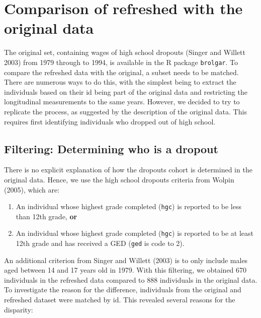 \documentclass[12pt]{article}
\providecommand{\tightlist}{%
  \setlength{\itemsep}{0pt}\setlength{\parskip}{0pt}}
\begin{document}
\hypertarget{compare}{%
\section{Comparison of refreshed with the original data}\label{compare}}

The original set, containing wages of high school dropouts (Singer and Willett 2003) from 1979 through to 1994, is available in the R package \texttt{brolgar}. To compare the refreshed data with the original, a subset needs to be matched. There are numerous ways to do this, with the simplest being to extract the individuals based on their id being part of the original data and restricting the longitudinal measurements to the same years. However, we decided to try to replicate the process, as suggested by the description of the original data. This requires first identifying individuals who dropped out of high school.

\hypertarget{filtering-determining-who-is-a-dropout}{%
\subsection{Filtering: Determining who is a dropout}\label{filtering-determining-who-is-a-dropout}}

There is no explicit explanation of how the dropouts cohort is determined in the original data. Hence, we use the high school dropouts criteria from Wolpin (2005), which are:

\begin{enumerate}
\def\labelenumi{\arabic{enumi}.}
\tightlist
\item
  An individual whose highest grade completed (\texttt{hgc}) is reported to be less than 12th grade, \textbf{or}
\item
  An individual whose highest grade completed (\texttt{hgc}) is reported to be at least 12th grade and has received a GED (\texttt{ged} is code to 2).
\end{enumerate}

An additional criterion from Singer and Willett (2003) is to only include males aged between 14 and 17 years old in 1979. With this filtering, we obtained 670 individuals in the refreshed data compared to 888 individuals in the original data. To investigate the reason for the difference, individuals from the original and refreshed dataset were matched by id. This revealed several reasons for the disparity:
\end{document}
